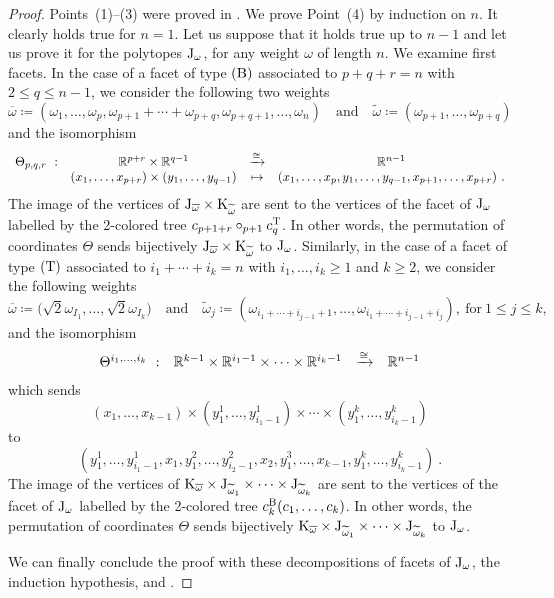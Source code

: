 \documentclass[twoside, 11pt]{amsart}
\theoremstyle{remark}
\begin{document}
\begin{proof}

Points~(1)--(3) were proved in \cite{Forcey08}.  
We prove Point~(4) by induction on $n$. 
It clearly holds true for $n=1$. Let us suppose that it holds true up to $n-1$ and let us prove it for the polytopes $\mathrm{J}_\omega$, for any weight $\omega$ of length $n$.
We examine first facets. 
In the case of a facet of type $(\mathrm{B})$ associated to $p+q+r=n$ with $2\leq q \leq n-1$, we consider the following two weights 
\[
\overline{\omega}\coloneqq (\omega_1, \ldots, \omega_{p}, \omega_{p+1}+\cdots+\omega_{p+q}, \omega_{p+q+1}, \ldots,  \omega_{n})
\quad \text{and} \quad 
\widetilde{\omega}\coloneqq (\omega_{p+1}, \ldots, \omega_{p+q})
\]
and the isomorphism 
\begin{align*}
\begin{array}{rccc}
\Theta_{p,q,r}\  : &  \mathbb{R}^{p+r}\times \mathbb{R}^{q-1} &\xrightarrow{\cong} &\mathbb{R}^{n-1}\\
&(x_1, \ldots, x_{p+r})\times (y_1, \ldots, y_{q-1}) & \mapsto& 
(x_1, \ldots, x_{p} , y_1, \ldots, y_{q-1}, x_{p+1}, \ldots, x_{p+r})\ .
\end{array}
\end{align*}
The image of the vertices of $\mathrm{J}_{\overline{\omega}}\times \mathrm{K}_{\widetilde{\omega}}$ are sent to the vertices of the facet of $\mathrm{J}_\omega$
labelled by the 2-colored tree $c_{p+1+r}\circ_{p+1} c^{\mathrm{T}}_q$. 
In other words, the permutation of coordinates $\Theta$ sends bijectively $\mathrm{J}_{\overline{\omega}}\times \mathrm{K}_{\widetilde{\omega}}$ to $\mathrm{J}_\omega$. 
Similarly, in the case of a facet of type $(\mathrm{T})$ associated to $i_1+\cdots+i_k=n$ with 
$i_1, \ldots,i_k\geq 1$ and $k\geq 2$, 
 we consider the following weights 
%
\[
\overline{\omega}\coloneqq \big(\sqrt{2}\omega_{I_1}, \ldots, \sqrt{2}\omega_{I_k}\big)
\quad \text{and} \quad 
\widetilde{\omega}_j\coloneqq (\omega_{i_1+\cdots+i_{j-1}+1}, \ldots, \omega_{i_1+\cdots+i_{j-1}+i_j}), \ \text{for}\ 1\leq j\leq k, 
\]
and the isomorphism 
\begin{align*}
\begin{array}{rccc}
\Theta^{i_1, \ldots, i_k}\  : &  \mathbb{R}^{k-1}\times \mathbb{R}^{i_1-1}\times \cdots \times \mathbb{R}^{i_k-1} &\xrightarrow{\cong} &\mathbb{R}^{n-1}
\end{array}
\end{align*}
which sends 
\[(x_1, \ldots, x_{k-1})\times (y_1^1, \ldots, y^1_{i_1-1})\times \cdots 
\times (y_1^k, \ldots, y^k_{i_k-1})\]
to 
\[(
y^1_1,\ldots, y^1_{i_1-1}, x_1, y^2_1, \ldots, y^2_{i_2-1}, x_2, y^3_1, \ldots, x_{k-1}, y^k_1, \ldots, y^k_{i_k-1}
)\ .\]
The image of the vertices of 
$\mathrm{K}_{\overline{\omega}}\times \mathrm{J}_{\widetilde{\omega}_1}\times \cdots \times \mathrm{J}_{\widetilde{\omega}_k}$ are sent to the vertices of the facet of $\mathrm{J}_\omega$
labelled by the 2-colored tree $c^{\mathrm{B}}_k(c_1, \ldots, c_k)$. In other words, the permutation of coordinates $\Theta$ sends bijectively $\mathrm{K}_{\overline{\omega}}\times \mathrm{J}_{\widetilde{\omega}_1}\times \cdots \times \mathrm{J}_{\widetilde{\omega}_k}$ to $\mathrm{J}_\omega$. 

We can finally conclude the proof with these decompositions of facets of $\mathrm{J}_\omega$, the induction hypothesis, and \cite[Proposition~1, Point~(5)]{MTTV19}.
\end{proof}
\end{document}
